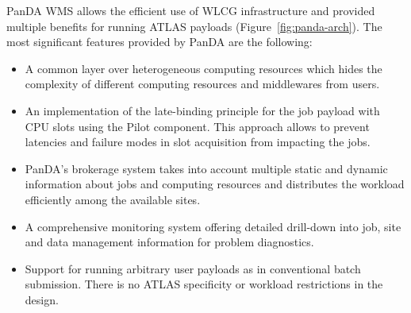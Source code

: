 \documentclass{webofc}
\begin{document}
PanDA WMS  allows the efficient use of WLCG infrastructure and provided multiple benefits for running ATLAS payloads (Figure~\ref{fig:panda-arch}).
The most significant features provided by PanDA are the following: 

\begin{itemize}
	\item A common layer over heterogeneous computing resources which hides the complexity of different computing resources and middlewares from users.
	\item An implementation of the late-binding principle for the job payload with CPU slots using the Pilot component. This approach allows to prevent  latencies and failure modes in slot acquisition from impacting the jobs.
	\item PanDA's brokerage system takes into account multiple static and dynamic information about jobs and computing resources and distributes the workload efficiently among the available sites.
	\item A comprehensive monitoring system offering detailed drill-down into job, site and data management information for problem diagnostics.
	\item Support for running arbitrary user payloads as in conventional batch submission. There is no ATLAS specificity or workload restrictions in the design.
	
	

\end{itemize}
\end{document}
